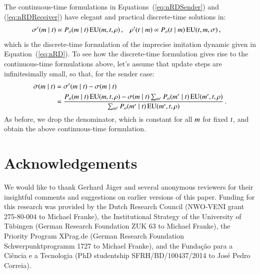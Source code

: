 \documentclass[11pt,english]{article}
\numberwithin{equation}{section}
\begin{document}
\begin{appendices}
The continuous-time formulations in Equations~(\ref{eq:nRDSender}) and (\ref{eq:nRDReceiver})
have elegant and practical discrete-time solutions in:
\begin{align*}
  \sigma'(m \mid t) & \propto P_o(m \mid t) \thinspace \mathrm{EU}(m,
  t, \rho)\,, & \rho'(t \mid m) & \propto P_o(t \mid m)
  \thinspace \mathrm{EU}(t, m, \sigma)\,,
\end{align*}
which is the discrete-time formulation of the imprecise imitation dynamic given in
Equation~(\ref{eq:nRD}). To see how the discrete-time formulation gives rise to the
continuous-time formulations above, let's assume that update steps are infinitesimally small,
so that, for the sender case:
\begin{align*}
  \dot{\sigma}(m \mid t) & = \sigma'(m \mid t) - \sigma(m
  \mid t)\\
  &= \frac{P_o(m \mid t) \thinspace \mathrm{EU}(m, t, \rho) - \sigma(m
    \mid t) \sum_{m'} P_o(m' \mid t) \thinspace \mathrm{EU}(m', t,
    \rho) }{ \sum_{m'} P_o(m' \mid t) \thinspace \mathrm{EU}(m', t,
    \rho)}\,.
\end{align*}
As before, we drop the denominator, which is constant for all $m$ for fixed $t$, and
obtain the above continuous-time formulation.

\end{appendices}

\section*{Acknowledgements}

We would like to thank Gerhard J\"{a}ger and several anonymous reviewers for their insightful comments and suggestions on
earlier versions of this paper. Funding for this research was provided by the Dutch Research
Council (NWO-VENI grant 275-80-004 to Michael Franke), the Institutional Strategy of the
University of T\"{u}bingen (German Research Foundation ZUK 63 to Michael Franke), the Priority
Program XPrag.de (German Research Foundation Schwerpunktprogramm 1727 to Michael Franke), and the Fundação para a Ciência	e a Tecnologia (PhD studentship SFRH/BD/100437/2014 to José Pedro Correia).






\end{document}
